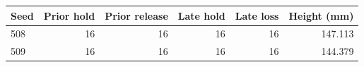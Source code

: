 \begin{tabular}{lrrrrr}
\toprule
Seed & Prior hold & Prior release & Late hold & Late loss & Height (mm)\\
\midrule
508 & 16 & 16 & 16 & 16 & 147.113\\
509 & 16 & 16 & 16 & 16 & 144.379\\
\bottomrule
\end{tabular}

